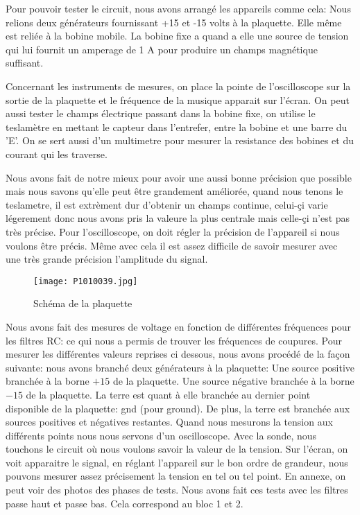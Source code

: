

Pour pouvoir tester le circuit, nous avons arrangé les appareils comme cela: Nous relions deux générateurs fournissant +15 et 
-15 volts à la plaquette.  Elle même est reliée à la bobine mobile.  La bobine fixe a quand a elle une source de tension qui 
lui fournit un amperage de 1 A pour produire un champs magnétique suffisant.


Concernant les instruments de mesures, on place la pointe de l'oscilloscope sur la sortie de la plaquette et le fréquence
de la musique apparait sur l'écran.  On peut aussi tester le champs électrique passant dans la bobine fixe, on utilise le
teslamètre en mettant le capteur dans l'entrefer, entre la bobine et une barre du 'E'.  On se sert aussi d'un multimetre
pour mesurer la resistance des bobines et du courant qui les traverse.


Nous avons fait de notre mieux pour avoir une aussi bonne précision que possible mais nous savons qu'elle peut être grandement
améliorée, quand nous tenons le teslametre, il est extrèment dur d'obtenir un champs continue, celui-çi varie légerement donc
nous avons pris la valeure la plus centrale mais celle-çi n'est pas très précise.  Pour l'oscilloscope, on doit régler 
la précision de l'appareil si nous voulons être précis.  Même avec cela il est assez difficile de savoir mesurer avec une
très grande précision l'amplitude du signal.

\begin{figure}[ht!]
    \centering
    \texttt{[image: P1010039.jpg]}
    \caption{Schéma de la plaquette}
    \label{plaquette}
\end{figure}



Nous avons fait des mesures de voltage en fonction de différentes fréquences pour les filtres RC: ce qui nous a permis
de trouver les fréquences de coupures. Pour mesurer les différentes valeurs reprises ci dessous, nous avons procédé de la
façon suivante: nous avons branché deux générateurs à la plaquette: Une source positive branchée à la borne $+15$ de la plaquette. 
Une source négative branchée à la borne $-15$ de la plaquette.  La terre est quant à elle branchée au dernier point 
disponible de la plaquette: gnd (pour ground).  De plus, la terre est branchée aux sources positives et négatives 
restantes.  Quand nous mesurons la tension aux différents points nous nous servons d'un oscilloscope.  Avec la sonde,
nous touchons le circuit où nous voulons savoir la valeur de la tension.  Sur l'écran, on voit apparaitre le 
signal, en réglant l'appareil sur le bon ordre de grandeur, nous pouvons mesurer assez précisement la tension en 
tel ou tel point.  En annexe, on peut voir des photos des phases de tests. 
  Nous avons fait ces tests avec les filtres
passe haut et passe bas.  Cela correspond au bloc 1 et 2.

